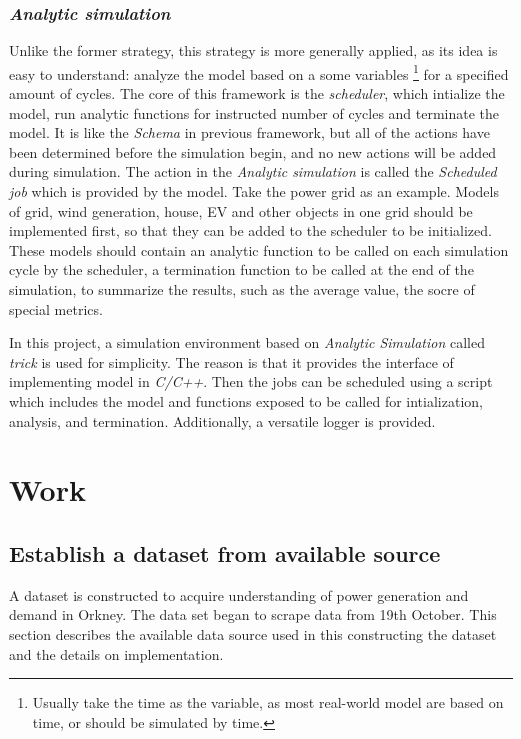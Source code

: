 \documentclass[12pt,a4paper]{report}
\begin{document}
        \subsection{\emph{Analytic simulation}}
        Unlike the former strategy, this strategy is more generally applied, as its idea is easy to understand: analyze the model based on a some variables \footnote{Usually take the time as the variable, as most real-world model are based on time, or should be simulated by time.} for a specified amount of cycles. The core of this framework is the \emph{scheduler}, which intialize the model, run analytic functions for instructed number of cycles and terminate the model. It is like the \emph{Schema} in previous framework, but all of the actions have been determined before the simulation begin, and no new actions will be added during simulation. The action in the \emph{Analytic simulation} is called the \emph{Scheduled job} which is provided by the model.
        Take the power grid as an example. Models of grid, wind generation, house, EV and other objects in one grid should be implemented first, so that they can be added to the scheduler to be initialized. These models should contain an analytic function to be called on each simulation cycle by the scheduler, a termination function to be called at the end of the simulation, to summarize the results, such as the average value, the socre of special metrics.

        In this project, a simulation environment based on \emph{Analytic Simulation} called \emph{trick} \cite{website:trick} is used for simplicity. The reason is that it provides the interface of implementing model in \emph{C/C++}. Then the jobs can be scheduled using a script which includes the model and functions exposed to be called for intialization, analysis, and termination. Additionally, a versatile logger is provided. 

    \chapter{Work}
        \section{Establish a dataset from available source}
        A dataset is constructed to acquire understanding of power generation and demand in Orkney. The data set began to scrape data from 19th October. 
        This section describes the available data source used in this constructing the dataset and the details on implementation.
\end{document}
